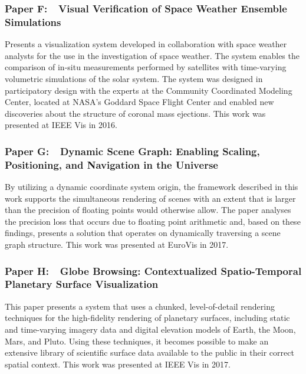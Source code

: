 \subsubsection{Paper F:~~Visual Verification of Space Weather Ensemble Simulations}
\vspace*{\absubsubsectionlength}
Presents a visualization system developed in collaboration with space weather analysts for the use in the investigation of space weather.  The system enables the comparison of in-situ measurements performed by satellites with time-varying volumetric simulations of the solar system.  The system was designed in participatory design with the experts at the Community Coordinated Modeling Center, located at NASA's Goddard Space Flight Center and enabled new discoveries about the structure of coronal mass ejections.  This work was presented at IEEE Vis in 2016.

\subsubsection{Paper G:~~Dynamic Scene Graph: Enabling Scaling, Positioning, and Navigation in the Universe}
\vspace*{\absubsubsectionlength}
By utilizing a dynamic coordinate system origin, the framework described in this work supports the simultaneous rendering of scenes with an extent that is larger than the precision of floating points would otherwise allow.  The paper analyses the precision loss that occurs due to floating point arithmetic and, based on these findings, presents a solution that operates on dynamically traversing a scene graph structure.  This work was presented at EuroVis in 2017.

\subsubsection{Paper H:~~Globe Browsing: Contextualized Spatio-Temporal Planetary Surface Visualization}
\vspace*{\absubsubsectionlength}
This paper presents a system that uses a chunked, level-of-detail rendering techniques for the high-fidelity rendering of planetary surfaces, including static and time-varying imagery data and digital elevation models of Earth, the Moon, Mars, and Pluto.  Using these techniques, it becomes possible to make an extensive library of scientific surface data available to the public in their correct spatial context.  This work was presented at IEEE Vis in 2017.

